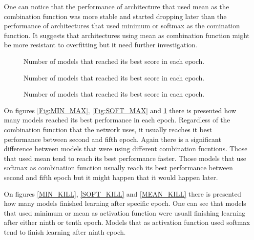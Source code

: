 \documentclass[a4paper,10pt]{report}
\begin{document}
    One can notice that the performance of architecture that used mean as the combination function was more stable and started dropping later than the performance of architectures that used minimum or softmax as the comination function. It suggests that architectures using mean as combination function might be more resistant to overfitting but it need further investigation.

    \begin{figure}[!htb]\centering
      \begin{minipage}{0.9\textwidth}
	\caption{Number of models that reached its best score in each epoch.}\label{Fig:SOFT_MAX}
      \end{minipage}
      
      \begin {minipage}{0.49\textwidth}
	\caption{Number of models that reached its best score in each epoch.}\label{Fig:MIN_MAX}
      \end{minipage}
      \begin {minipage}{0.49\textwidth}
	\caption{Number of models that reached its best score in each epoch.}\label{Fig:MEAN_MAX}
      \end{minipage}
    \end{figure}
    
    On figures \ref{Fig:MIN_MAX}, \ref{Fig:SOFT_MAX} and \ref{Fig:MEAN_MAX} there is presented how many models reached its best performance in each epoch. Regardless of the combination function that the network uses, it usually reaches it best performance between second and fifth epoch. Again there is a significant difference between models that were using different combination fucntions. Those that used mean tend to reach its best performance faster. Those models that use softmax as combination function usually reach its best performance between second and fifth epoch but it might happen that it would happen later. 

    On figures \ref{MIN_KILL}, \ref{SOFT_KILL} and \ref{MEAN_KILL} there is presented how many models finished learning after specific epoch. One can see that models that used minimum or mean as activation function were usuall finishing learning after either ninth or tenth epoch. Models that as activation function used softmax tend to finish learning after ninth epoch.
    
\end{document}
